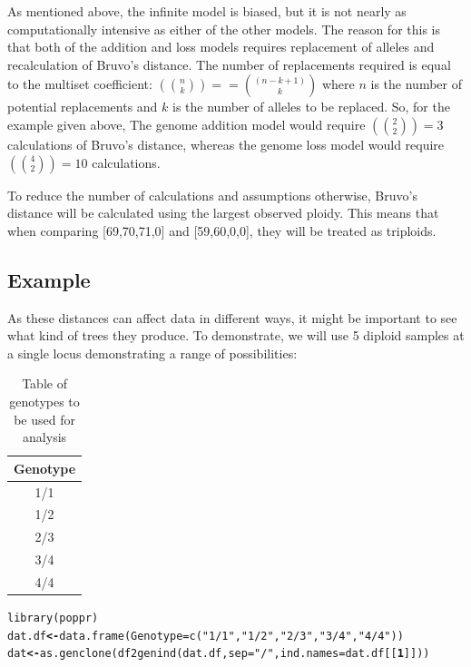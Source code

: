 \documentclass[letterpaper]{article}\usepackage[]{graphicx}\usepackage[]{color}
\makeatletter
\newcommand{\hlnum}[1]{\textcolor[rgb]{0.502,0,0.502}{\textbf{#1}}}%
\newcommand{\hlstr}[1]{\textcolor[rgb]{0.651,0.522,0}{#1}}%
\newcommand{\hlstd}[1]{\textcolor[rgb]{0,0,0}{#1}}%
\newcommand{\hlkwb}[1]{\textcolor[rgb]{0.502,0.502,0.753}{\textbf{#1}}}%
\newcommand{\hlkwc}[1]{\textcolor[rgb]{0,0.502,0.753}{#1}}%
\newcommand{\hlkwd}[1]{\textcolor[rgb]{0,0.267,0.4}{#1}}%
\newenvironment{kframe}{%
 \def\at@end@of@kframe{}%
 \ifinner\ifhmode%
  \def\at@end@of@kframe{\end{minipage}}%
  \begin{minipage}{\columnwidth}%
 \fi\fi%
 \def\FrameCommand##1{\hskip\@totalleftmargin \hskip-\fboxsep
 \colorbox{shadecolor}{##1}\hskip-\fboxsep
     \hskip-\linewidth \hskip-\@totalleftmargin \hskip\columnwidth}%
 \MakeFramed {\advance\hsize-\width
   \@totalleftmargin\z@ \linewidth\hsize
   \@setminipage}}%
 {\par\unskip\endMakeFramed%
 \at@end@of@kframe}
\newenvironment{knitrout}{}{} %
\makeatother
\begin{document}
As mentioned above, the infinite model is biased, but it is not nearly as
computationally intensive as either of the other models. The reason for this is
that both of the addition and loss models requires replacement of alleles and
recalculation of Bruvo's distance. The number of replacements required is equal
to the multiset coefficient: $\left({n \choose k}\right) == {(n-k+1) \choose k}$
where $n$ is the number of potential replacements and $k$ is the number of
alleles to be replaced. So, for the example given above, The genome addition
model would require $\left({2 \choose 2}\right) = 3$ calculations of Bruvo's
distance, whereas the genome loss model would require $\left({4 \choose
2}\right) = 10$ calculations.

To reduce the number of calculations and assumptions otherwise, Bruvo's distance
will be calculated using the largest observed ploidy. This means that when
comparing [69,70,71,0] and [59,60,0,0], they will be treated as triploids.

\subsection{Example}

As these distances can affect data in different ways, it might be important
to see what kind of trees they produce. To demonstrate, we will use 5 diploid
samples at a single locus demonstrating a range of possibilities:

\begin{table}[ht]
\centering
\begin{tabular}{c}
  \hline
Genotype \\ 
  \hline
1/1 \\ 
  1/2 \\ 
  2/3 \\ 
  3/4 \\ 
  4/4 \\ 
   \hline
\end{tabular}
\caption{Table of genotypes to be used for analysis} 
\end{table}

\begin{knitrout}\footnotesize
{}\color{fgcolor}\begin{kframe}
\begin{alltt}
\hlkwd{library}\hlstd{(poppr)}
\hlstd{dat.df} \hlkwb{<-} \hlkwd{data.frame}\hlstd{(}\hlkwc{Genotype} \hlstd{=} \hlkwd{c}\hlstd{(}\hlstr{"1/1"}\hlstd{,} \hlstr{"1/2"}\hlstd{,} \hlstr{"2/3"}\hlstd{,} \hlstr{"3/4"}\hlstd{,} \hlstr{"4/4"}\hlstd{))}
\hlstd{dat} \hlkwb{<-} \hlkwd{as.genclone}\hlstd{(}\hlkwd{df2genind}\hlstd{(dat.df,} \hlkwc{sep} \hlstd{=} \hlstr{"/"}\hlstd{,} \hlkwc{ind.names} \hlstd{= dat.df[[}\hlnum{1}\hlstd{]]))}
\end{alltt}
\end{kframe}
\end{knitrout}
\end{document}
